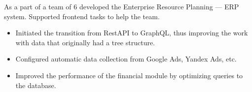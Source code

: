 As a part of a team of 6 developed the Enterprise Resource Planning — ERP system. Supported frontend tasks to help the team.

\begin{itemize}
    \item Initiated the transition from RestAPI to GraphQL, thus improving the work with data that originally had a tree structure.
    \item Configured automatic data collection from Google Ads, Yandex Ads, etc.
    \item Improved the performance of the financial module by optimizing queries to the database.
\end{itemize}

